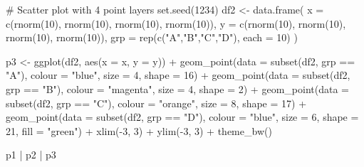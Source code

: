 \documentclass[
  letterpaper,
  DIV=11,
  numbers=noendperiod]{scrartcl}
\newenvironment{Shaded}{\begin{snugshade}}{\end{snugshade}}
\newcommand{\AttributeTok}[1]{\textcolor[rgb]{0.40,0.45,0.13}{#1}}
\newcommand{\CommentTok}[1]{\textcolor[rgb]{0.37,0.37,0.37}{#1}}
\newcommand{\DecValTok}[1]{\textcolor[rgb]{0.68,0.00,0.00}{#1}}
\newcommand{\FunctionTok}[1]{\textcolor[rgb]{0.28,0.35,0.67}{#1}}
\newcommand{\NormalTok}[1]{\textcolor[rgb]{0.00,0.23,0.31}{#1}}
\newcommand{\OtherTok}[1]{\textcolor[rgb]{0.00,0.23,0.31}{#1}}
\newcommand{\SpecialCharTok}[1]{\textcolor[rgb]{0.37,0.37,0.37}{#1}}
\newcommand{\StringTok}[1]{\textcolor[rgb]{0.13,0.47,0.30}{#1}}
\begin{document}
\begin{Shaded}
\begin{Highlighting}[]
\CommentTok{\# Scatter plot with 4 point layers}
\FunctionTok{set.seed}\NormalTok{(}\DecValTok{1234}\NormalTok{)}
\NormalTok{df2 }\OtherTok{\textless{}{-}} \FunctionTok{data.frame}\NormalTok{(}
  \AttributeTok{x   =} \FunctionTok{c}\NormalTok{(}\FunctionTok{rnorm}\NormalTok{(}\DecValTok{10}\NormalTok{), }\FunctionTok{rnorm}\NormalTok{(}\DecValTok{10}\NormalTok{), }\FunctionTok{rnorm}\NormalTok{(}\DecValTok{10}\NormalTok{), }\FunctionTok{rnorm}\NormalTok{(}\DecValTok{10}\NormalTok{)),}
  \AttributeTok{y   =} \FunctionTok{c}\NormalTok{(}\FunctionTok{rnorm}\NormalTok{(}\DecValTok{10}\NormalTok{), }\FunctionTok{rnorm}\NormalTok{(}\DecValTok{10}\NormalTok{), }\FunctionTok{rnorm}\NormalTok{(}\DecValTok{10}\NormalTok{), }\FunctionTok{rnorm}\NormalTok{(}\DecValTok{10}\NormalTok{)),}
  \AttributeTok{grp =} \FunctionTok{rep}\NormalTok{(}\FunctionTok{c}\NormalTok{(}\StringTok{"A"}\NormalTok{,}\StringTok{"B"}\NormalTok{,}\StringTok{"C"}\NormalTok{,}\StringTok{"D"}\NormalTok{), }\AttributeTok{each =} \DecValTok{10}\NormalTok{)}
\NormalTok{)}

\NormalTok{p3 }\OtherTok{\textless{}{-}} \FunctionTok{ggplot}\NormalTok{(df2, }\FunctionTok{aes}\NormalTok{(}\AttributeTok{x =}\NormalTok{ x, }\AttributeTok{y =}\NormalTok{ y)) }\SpecialCharTok{+}
  \FunctionTok{geom\_point}\NormalTok{(}\AttributeTok{data =} \FunctionTok{subset}\NormalTok{(df2, grp }\SpecialCharTok{==} \StringTok{"A"}\NormalTok{),}
             \AttributeTok{colour =} \StringTok{"blue"}\NormalTok{,   }\AttributeTok{size =} \DecValTok{4}\NormalTok{,  }\AttributeTok{shape =} \DecValTok{16}\NormalTok{) }\SpecialCharTok{+}
  \FunctionTok{geom\_point}\NormalTok{(}\AttributeTok{data =} \FunctionTok{subset}\NormalTok{(df2, grp }\SpecialCharTok{==} \StringTok{"B"}\NormalTok{),}
             \AttributeTok{colour =} \StringTok{"magenta"}\NormalTok{, }\AttributeTok{size =} \DecValTok{4}\NormalTok{, }\AttributeTok{shape =} \DecValTok{2}\NormalTok{) }\SpecialCharTok{+}
  \FunctionTok{geom\_point}\NormalTok{(}\AttributeTok{data =} \FunctionTok{subset}\NormalTok{(df2, grp }\SpecialCharTok{==} \StringTok{"C"}\NormalTok{),}
             \AttributeTok{colour =} \StringTok{"orange"}\NormalTok{, }\AttributeTok{size =} \DecValTok{8}\NormalTok{,  }\AttributeTok{shape =} \DecValTok{17}\NormalTok{) }\SpecialCharTok{+}
  \FunctionTok{geom\_point}\NormalTok{(}\AttributeTok{data =} \FunctionTok{subset}\NormalTok{(df2, grp }\SpecialCharTok{==} \StringTok{"D"}\NormalTok{),}
             \AttributeTok{colour =} \StringTok{"blue"}\NormalTok{,   }\AttributeTok{size =} \DecValTok{6}\NormalTok{,  }\AttributeTok{shape =} \DecValTok{21}\NormalTok{, }\AttributeTok{fill =} \StringTok{"green"}\NormalTok{) }\SpecialCharTok{+}
  \FunctionTok{xlim}\NormalTok{(}\SpecialCharTok{{-}}\DecValTok{3}\NormalTok{, }\DecValTok{3}\NormalTok{) }\SpecialCharTok{+} \FunctionTok{ylim}\NormalTok{(}\SpecialCharTok{{-}}\DecValTok{3}\NormalTok{, }\DecValTok{3}\NormalTok{) }\SpecialCharTok{+}
  \FunctionTok{theme\_bw}\NormalTok{()}

\NormalTok{p1 }\SpecialCharTok{|}\NormalTok{ p2 }\SpecialCharTok{|}\NormalTok{ p3}
\end{Highlighting}
\end{Shaded}
\end{document}
